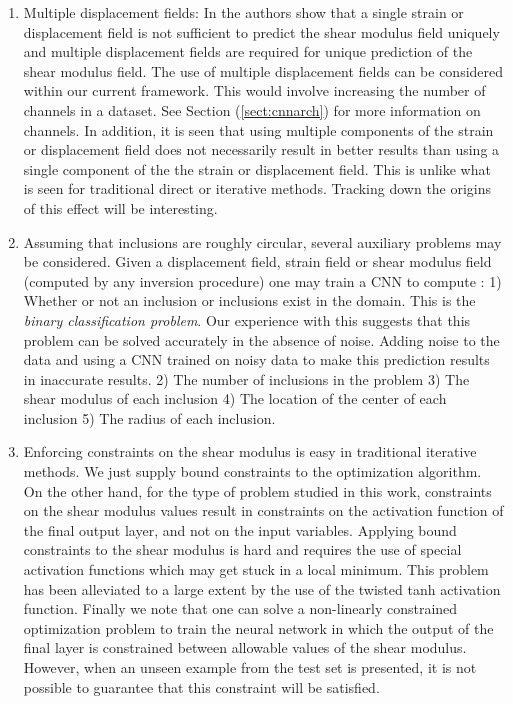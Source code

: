 \documentclass[12pt]{article}
\begin{document}
\begin{enumerate}
\item{Multiple displacement fields: In \cite{paper:barbonegokhale,paper:barbonebamber} the authors show that a single strain or displacement field is not sufficient to predict the shear modulus field uniquely and multiple displacement fields are required for unique prediction of the shear modulus field. The use of multiple displacement fields can be considered within our current framework. This would involve increasing the number of channels in a dataset. See Section (\ref{sect:cnnarch}) for more information on channels. In addition, it is seen that using multiple components of the strain or displacement field does not necessarily result in better results than using a single component of the the strain or displacement field. This is unlike what is seen for traditional direct or iterative methods. Tracking down the origins of this effect will be interesting.} 
\item{Assuming that inclusions are roughly circular, several auxiliary problems may be considered. Given a displacement field, strain field or shear modulus field (computed by any inversion procedure) one may train a CNN to compute : 1) Whether or not an inclusion or inclusions exist  in the domain. This is the \textit{binary classification problem}. Our experience with this suggests that this problem can be solved accurately in the absence of noise.  Adding noise to the data and using a CNN trained on noisy data to make this prediction results in inaccurate results. 2) The number of inclusions in the problem 3) The shear modulus of each inclusion 4) The location of the center of each inclusion 5) The radius of each inclusion.}
\item{Enforcing constraints on the shear modulus is easy in traditional iterative methods. We just supply bound constraints to the optimization algorithm. On the other hand, for the type of problem studied in this work, constraints on the shear modulus values result in constraints on the activation function of the final output layer, and not on the input variables. Applying bound constraints to the shear modulus is hard and requires the use of special activation functions which may get stuck in a local minimum. This problem has been alleviated to a large extent by the use of the twisted tanh activation function. Finally we note that one can solve a non-linearly constrained optimization problem to train the neural network in which the output of the final layer is constrained between allowable values of the shear modulus. However, when an unseen example from the test set is presented, it is not possible to guarantee that this constraint will be satisfied.}

\end{enumerate}
\end{document}
